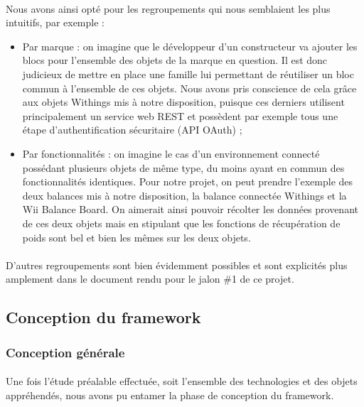 \documentclass[nocopyrightspace]{sigplanconf}
\begin{document}
		\paragraph{}
		Nous avons ainsi opté pour les regroupements qui nous semblaient les plus intuitifs, par exemple :
		\begin{itemize}
			\item Par marque : on imagine que le développeur d’un constructeur va ajouter les blocs pour l’ensemble des objets de la marque en question. Il est donc judicieux de mettre en place une famille lui permettant de réutiliser un bloc commun à l’ensemble de ces objets. Nous avons pris conscience de cela grâce aux objets Withings mis à notre disposition, puisque ces derniers utilisent principalement un service web REST\cite{apirest} et possèdent par exemple tous une étape d’authentification sécuritaire (API OAuth) ;
			\item Par fonctionnalités : on imagine le cas d’un environnement connecté possédant plusieurs objets de même type, du moins ayant en commun des fonctionnalités identiques. Pour notre projet, on peut prendre l’exemple des deux balances mis à notre disposition, la balance connectée Withings et la Wii Balance Board. On aimerait ainsi pouvoir récolter les données provenant de ces deux objets mais en stipulant que les fonctions de récupération de poids sont bel et bien les mêmes sur les deux objets.
		\end{itemize}

		\paragraph{}
		D’autres regroupements sont bien évidemment possibles et sont explicités plus amplement dans le document rendu pour le jalon \#1 de ce projet.

	\subsection{Conception du framework}
		\subsubsection{Conception générale}

			\paragraph{}
			Une fois l’étude préalable effectuée, soit l’ensemble des technologies et des objets appréhendés, nous avons pu entamer la phase de conception du framework.
\end{document}
